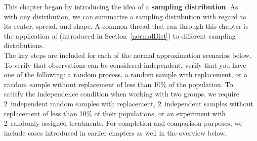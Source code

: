 {}

\reviewchapterheader{}
\newcommand{\chdistvertparagraphspace}{3mm}

\noindent This chapter began by introducing the idea of a \textbf{sampling distribution}.  As with any distribution, we can summarize a sampling distribution with regard to its center, spread, and shape.  A common thread that ran through this chapter is the application of  (introduced in Section~\ref{normalDist}) to different sampling distributions.\\[\chdistvertparagraphspace]
The key steps are included for each of the normal approximation scenarios below.  To verify that observations can be considered independent, verify that you have one of the following: a random process, a random sample with replacement, or a random sample without replacement of less than 10\% of the population.
To satisfy the independence condition when working with two groups, we require 2~independent random samples with replacement, 2~independent samples without replacement of less than 10\% of their populations, or an experiment with 2~randomly assigned treatments.
For completion and comparison purposes, we include cases introduced in earlier chapters as well in the overview below.

